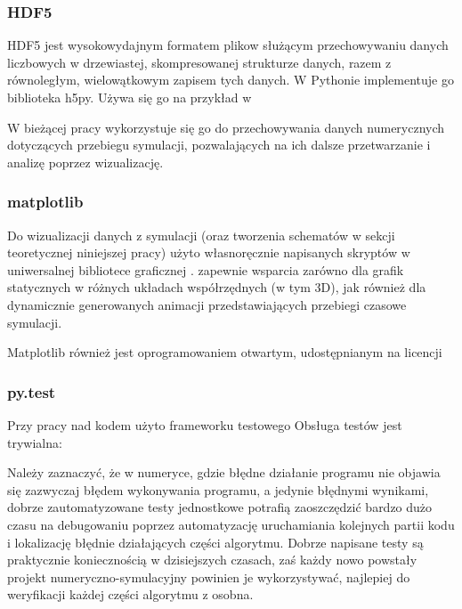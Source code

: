 

    \subsubsection{HDF5}
    HDF5 jest wysokowydajnym formatem plikow służącym przechowywaniu danych
    liczbowych w drzewiastej, skompresowanej strukturze danych, razem z
    równoległym, wielowątkowym zapisem tych danych.  W Pythonie implementuje go
    biblioteka h5py.  Używa się go na przykład w

    W bieżącej pracy wykorzystuje się go do przechowywania danych numerycznych
    dotyczących przebiegu symulacji, pozwalających na ich dalsze przetwarzanie
    i analizę poprzez wizualizację.

    \subsubsection{matplotlib}
    Do wizualizacji danych z symulacji (oraz tworzenia schematów w sekcji
    teoretycznej niniejszej pracy) użyto własnoręcznie napisanych skryptów w
    uniwersalnej bibliotece graficznej . 
    zapewnie wsparcia zarówno dla grafik statycznych w różnych układach
    współrzędnych (w tym 3D), jak również dla dynamicznie generowanych animacji
    przedstawiających przebiegi czasowe symulacji.

    Matplotlib również jest oprogramowaniem otwartym, udostępnianym na licencji

    \subsubsection{py.test}
    Przy pracy nad kodem użyto frameworku testowego 
     Obsługa testów jest trywialna:


    Należy zaznaczyć, że w numeryce, gdzie błędne działanie programu nie
    objawia się zazwyczaj błędem wykonywania programu, a jedynie błędnymi
    wynikami, dobrze zautomatyzowane testy jednostkowe potrafią zaoszczędzić
    bardzo dużo czasu na debugowaniu poprzez automatyzację uruchamiania
    kolejnych partii kodu i lokalizację błędnie działających części algorytmu.
    Dobrze napisane testy są praktycznie koniecznością w dzisiejszych czasach,
    zaś każdy nowo powstały projekt numeryczno-symulacyjny powinien je
    wykorzystywać, najlepiej do weryfikacji każdej części algorytmu z osobna.

